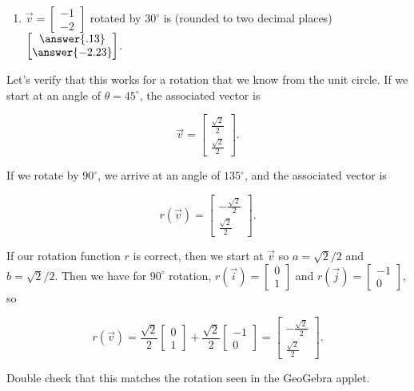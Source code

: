 \documentclass{ximera}
\begin{document}
\begin{example}
\begin{enumerate}
            \item $\vec{v}=\begin{bmatrix} -1 \\ -2 \end{bmatrix}$ rotated by $30^\circ$ is (rounded to two decimal places) $\begin{bmatrix} \answer{.13} \\ \answer{-2.23} \end{bmatrix}$.
        \end{enumerate}

    \end{example}

    \begin{example}

        Let's verify that this works for a rotation that we know from the unit circle. If we start at an angle of $\theta = 45^\circ$, the associated vector is 
        
        $$\vec{v}=\begin{bmatrix} \frac{\sqrt{2}}{2} \\ \frac{\sqrt{2}}{2} \end{bmatrix}.$$

        If we rotate by $90^\circ$, we arrive at an angle of $135^\circ$, and the associated vector is 

        $$r(\vec{v}) = \begin{bmatrix} -\frac{\sqrt{2}}{2} \\ \frac{\sqrt{2}}{2} \end{bmatrix}.$$

        If our rotation function $r$ is correct, then we start at $\vec{v}$ so $a=\sqrt{2}/2$ and $b=\sqrt{2}/2$. Then we have for $90^\circ$ rotation, $r(\vec{i})=\begin{bmatrix} 0 \\ 1 \end{bmatrix}$ and $r(\vec{j})=\begin{bmatrix} -1 \\ 0 \end{bmatrix}$, so 

        $$r(\vec{v}) = \frac{\sqrt{2}}{2} \begin{bmatrix} 0 \\ 1 \end{bmatrix} + \frac{\sqrt{2}}{2} \begin{bmatrix} -1 \\ 0 \end{bmatrix} = \begin{bmatrix} -\frac{\sqrt{2}}{2} \\ \frac{\sqrt{2}}{2} \end{bmatrix}.$$

        Double check that this matches the rotation seen in the GeoGebra applet.

    \end{example}
\end{document}
